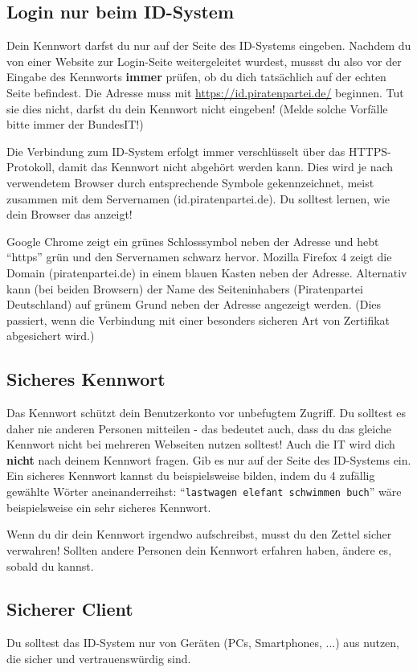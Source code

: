 \documentclass[parskip=half]{scrartcl}
\begin{document}
\subsection{Login nur beim ID-System}
Dein Kennwort darfst du nur auf der Seite des ID-Systems eingeben.
Nachdem du von einer Website zur Login-Seite weitergeleitet wurdest, mussst du also vor der Eingabe des Kennworts \textbf{immer} prüfen,
ob du dich tatsächlich auf der echten Seite befindest.
Die Adresse muss mit \url{https://id.piratenpartei.de/} beginnen. Tut sie dies nicht, darfst du dein Kennwort nicht eingeben!
(Melde solche Vorfälle bitte immer der BundesIT!)

Die Verbindung zum ID-System erfolgt immer verschlüsselt über das HTTPS-Protokoll, damit das Kennwort nicht abgehört werden kann.
Dies wird je nach verwendetem Browser durch entsprechende Symbole gekennzeichnet, meist zusammen mit dem Servernamen (id.piratenpartei.de).
Du solltest lernen, wie dein Browser das anzeigt!

Google Chrome zeigt ein grünes Schlosssymbol neben der Adresse und hebt "`https"' grün und den Servernamen schwarz hervor.
Mozilla Firefox 4 zeigt die Domain (piratenpartei.de) in einem blauen Kasten neben der Adresse.
Alternativ kann (bei beiden Browsern) der Name des Seiteninhabers (Piratenpartei Deutschland) auf grünem Grund neben der Adresse angezeigt werden.
(Dies passiert, wenn die Verbindung mit einer besonders sicheren Art von Zertifikat abgesichert wird.)

\subsection{Sicheres Kennwort}
Das Kennwort schützt dein Benutzerkonto vor unbefugtem Zugriff.
Du solltest es daher nie anderen Personen mitteilen - das bedeutet auch, dass du das gleiche Kennwort nicht bei mehreren Webseiten nutzen solltest!
Auch die IT wird dich \textbf{nicht} nach deinem Kennwort fragen. Gib es nur auf der Seite des ID-Systems ein.
Ein sicheres Kennwort kannst du beispielsweise bilden, indem du 4 zufällig gewählte Wörter aneinanderreihst:
"`\texttt{lastwagen elefant schwimmen buch}"' wäre beispielsweise ein sehr sicheres Kennwort.

Wenn du dir dein Kennwort irgendwo aufschreibst, musst du den Zettel sicher verwahren!
Sollten andere Personen dein Kennwort erfahren haben, ändere es, sobald du kannst.

\subsection{Sicherer Client}
Du solltest das ID-System nur von Geräten (PCs, Smartphones, ...) aus nutzen, die sicher und vertrauenswürdig sind.
\end{document}
